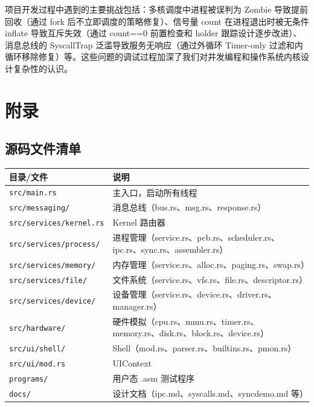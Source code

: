 \documentclass[UTF8,a4paper,12pt]{ctexart}
\begin{document}
项目开发过程中遇到的主要挑战包括：多核调度中进程被误判为 Zombie 导致提前回收（通过 fork 后不立即调度的策略修复）、信号量 count 在进程退出时被无条件 inflate 导致互斥失效（通过 count==0 前置检查和 holder 跟踪设计逐步改进）、消息总线的 SyscallTrap 泛滥导致服务无响应（通过外循环 Timer-only 过滤和内循环移除修复）等。这些问题的调试过程加深了我们对并发编程和操作系统内核设计复杂性的认识。

\newpage

\section{附录}

\subsection{源码文件清单}

\begin{center}
\begin{tabularx}{0.95\textwidth}{|l|X|}
\hline
\textbf{目录/文件} & \textbf{说明} \\
\hline
\texttt{src/main.rs} & 主入口，启动所有线程 \\
\texttt{src/messaging/} & 消息总线（bus.rs、msg.rs、response.rs） \\
\texttt{src/services/kernel.rs} & Kernel 路由器 \\
\texttt{src/services/process/} & 进程管理（service.rs、pcb.rs、scheduler.rs、ipc.rs、sync.rs、assembler.rs） \\
\texttt{src/services/memory/} & 内存管理（service.rs、alloc.rs、paging.rs、swap.rs） \\
\texttt{src/services/file/} & 文件系统（service.rs、vfs.rs、file.rs、descriptor.rs） \\
\texttt{src/services/device/} & 设备管理（service.rs、device.rs、driver.rs、manager.rs） \\
\texttt{src/hardware/} & 硬件模拟（cpu.rs、mmu.rs、timer.rs、memory.rs、disk.rs、block.rs、device.rs） \\
\texttt{src/ui/shell/} & Shell（mod.rs、parser.rs、builtins.rs、pmon.rs） \\
\texttt{src/ui/mod.rs} & UIContext \\
\texttt{programs/} & 用户态 .asm 测试程序 \\
\texttt{docs/} & 设计文档（ipc.md、syscalls.md、syncdemo.md 等） \\
\hline
\end{tabularx}
\end{center}
\end{document}
